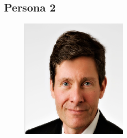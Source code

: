 \documentclass{article}
\begin{document}
\subsection{Persona 2}
\begin{figure}[h!]
    \centering
    \includegraphics{picture2.jpg}
\end{figure}
\end{document}
